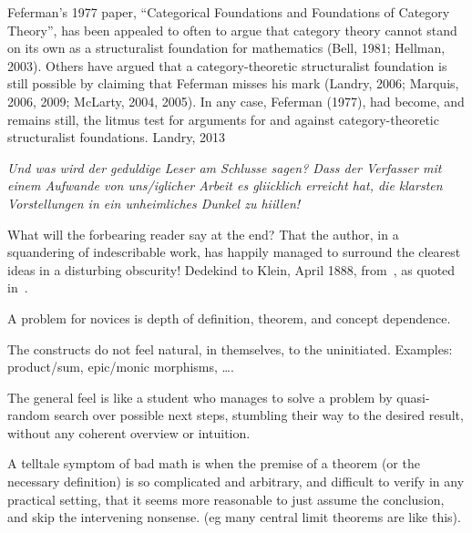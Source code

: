 \documentclass[11pt,openany]{book}
\begin{document}
\begin{boxquote}
Feferman’s 1977 paper, ``Categorical Foundations and Foundations
of Category Theory'', has been appealed to often to argue 
that category theory cannot stand
on its own as a structuralist foundation for mathematics
(Bell, 1981; Hellman, 2003).
Others have argued that a category-theoretic structuralist 
foundation is still possible by
claiming that Feferman misses his mark 
(Landry, 2006; Marquis, 2006, 2009; McLarty,
2004, 2005). 
In any case, Feferman (1977), had become, and remains still, 
the litmus test for arguments for and against category-theoretic
 structuralist foundations.
\tcblower
{Landry, 2013~\cite{landry_2013_feferman}}
\end{boxquote}

\label{sec:Complexity}

\begin{boxquote}
\textsl{Und was wird der geduldige Leser am
Schlusse sagen? Dass der Verfasser mit einem Aufwande von uns/iglicher Arbeit es gliicklich
erreicht hat, die klarsten Vorstellungen in ein unheimliches Dunkel zu hiillen!}
\par
What will the forbearing reader say at the end? That the author,
 in a squandering of indescribable work, 
 has happily managed to surround 
the clearest ideas in a disturbing obscurity!
\tcblower
{Dedekind to Klein, April 1888, 
from~\cite{dugac_1976_dedekind_fondements},
as quoted in~\cite{ferreiros2007labyrinth}.}
\end{boxquote}

A problem for novices is depth of definition, theorem,
and concept dependence.


The constructs do not feel natural, in themselves, 
to the uninitiated.
Examples: product/sum, epic/monic morphisms, {\ldots}.

The general feel is like a student who manages to solve a problem
by quasi-random search over possible next steps,
stumbling their way to the desired result,
without any coherent overview or intuition.

A telltale symptom of bad math is when the premise of a theorem
(or the necessary definition) is so complicated and arbitrary,
and difficult to verify in any practical setting,
that it seems more reasonable to just assume the conclusion,
and skip the intervening nonsense.
(eg many central limit theorems are like this).
\end{document}
